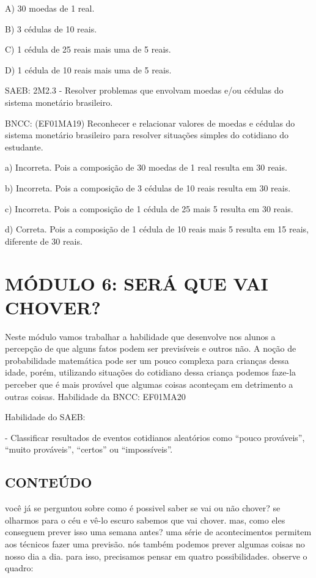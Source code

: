 A) 30 moedas de 1 real.

B) 3 cédulas de 10 reais.

C) 1 cédula de 25 reais mais uma de 5 reais.

D) 1 cédula de 10 reais mais uma de 5 reais.

SAEB: 2M2.3 - Resolver problemas que envolvam moedas e/ou cédulas do
sistema monetário brasileiro.

BNCC: (EF01MA19) Reconhecer e relacionar valores de moedas e cédulas do
sistema monetário brasileiro para resolver situações simples do
cotidiano do estudante.

a) Incorreta. Pois a composição de 30 moedas de 1 real resulta em 30
reais.

b) Incorreta. Pois a composição de 3 cédulas de 10 reais resulta em 30
reais.

c) Incorreta. Pois a composição de 1 cédula de 25 mais 5 resulta em 30
reais.

d) Correta. Pois a composição de 1 cédula de 10 reais mais 5 resulta em
15 reais, diferente de 30 reais.

\section{MÓDULO 6: SERÁ QUE VAI
CHOVER?}\label{muxf3dulo-6-seruxe1-que-vai-chover}

Neste módulo vamos trabalhar a habilidade que desenvolve nos alunos a
percepção de que alguns fatos podem ser previsíveis e outros não. A
noção de probabilidade matemática pode ser um pouco complexa para
crianças dessa idade, porém, utilizando situações do cotidiano dessa
criança podemos faze-la perceber que é mais provável que algumas coisas
aconteçam em detrimento a outras coisas. Habilidade da BNCC: EF01MA20

Habilidade do SAEB:

- Classificar resultados de eventos cotidianos aleatórios como ``pouco
prováveis'', ``muito prováveis'', ``certos'' ou ``impossíveis''.

\subsection{CONTEÚDO}\label{conteuxfado-5}

você já se perguntou sobre como é possivel saber se vai ou não chover?
se olharmos para o céu e vê-lo escuro sabemos que vai chover. mas, como
eles conseguem prever isso uma semana antes? uma série de acontecimentos
permitem aos técnicos fazer uma previsão. nós também podemos prever
algumas coisas no nosso dia a dia. para isso, precisamos pensar em
quatro possibilidades. observe o quadro:


